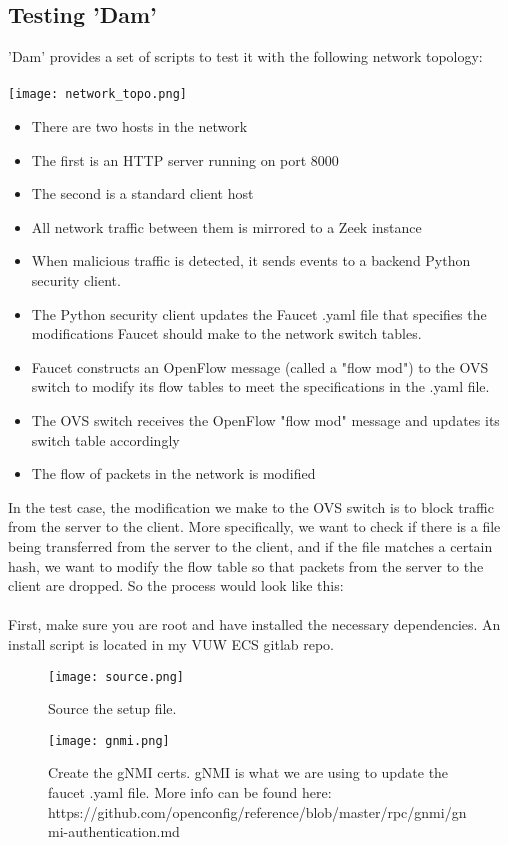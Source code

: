 \documentclass{article}
\begin{document}
\newpage 

\subsection{Testing 'Dam'}
'Dam' provides a set of scripts to test it with the following network topology:
\\
\\
\texttt{[image: network\_topo.png]}
\begin{itemize}
    \item There are two hosts in the network
    \item The first is an HTTP server running on port 8000
    \item The second is a standard client host
    \item All network traffic between them is mirrored to a Zeek instance
    \item When malicious traffic is detected, it sends events to a backend Python security client.
    \item The Python security client updates the Faucet .yaml file that specifies the modifications Faucet should make to the network switch tables.
    \item Faucet constructs an OpenFlow message (called a "flow mod") to the OVS switch to modify its flow tables to meet the specifications in the .yaml file.
    \item The OVS switch receives the OpenFlow "flow mod" message and updates its switch table accordingly
    \item The flow of packets in the network is modified
\end{itemize}
In the test case, the modification we make to the OVS switch is to block traffic from the server to the client. More specifically, we want to check if there is a file being transferred from the server to the client, and if the file matches a certain hash, we want to modify the flow table so that packets from the server to the client are dropped. So the process would look like this:
\\
\\
First, make sure you are root and have installed the necessary dependencies. An install script is located in my VUW ECS gitlab repo.
\begin{figure}[h!]
\caption{Source the setup file.}
\texttt{[image: source.png]}
\end{figure}
\begin{figure}[h!]
\texttt{[image: gnmi.png]}
\caption{Create the gNMI certs. gNMI is what we are using to update the faucet .yaml file. More info can be found here: https://github.com/openconfig/reference/blob/master/rpc/gnmi/gnmi-authentication.md}
\end{figure}
\end{document}
